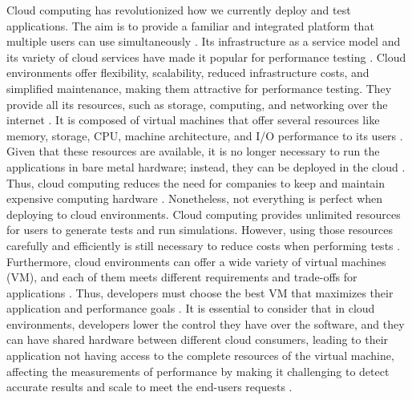 Cloud computing has revolutionized how we currently deploy and test applications. The aim is to provide a familiar and integrated platform that multiple users can use simultaneously \cite{hwang2015cloudperformance}. Its infrastructure as a service model and its variety of cloud services have made it popular for performance testing \cite{scheuner2018cloudBenchmarkingSuit, scheuner2018estimatingCloudApplication}. Cloud environments offer flexibility, scalability, reduced infrastructure costs, and simplified maintenance, making them attractive for performance testing. They provide all its resources, such as storage, computing, and networking over the internet \cite{vazquez2014cloudBenchmarkSurvey, borhani2014wpress, langer2011virtualmachineperformancebenchmarking}. It is composed of virtual machines that offer several resources like memory, storage, \ac{CPU}, machine architecture, and \ac{I/O} performance to its users \cite{gillam2013fair}. Given that these resources are available, it is no longer necessary to run the applications in bare metal hardware; instead, they can be deployed in the cloud \cite{he2019statistics, iosup2011performanceVariability}. Thus, cloud computing reduces the need for companies to keep and maintain expensive computing hardware \cite{iosup2011performanceVariability}. Nonetheless, not everything is perfect when deploying to cloud environments. Cloud computing provides unlimited resources for users to generate tests and run simulations. However, using those resources carefully and efficiently is still necessary to reduce costs when performing tests \cite{snellman2011towardsAutomatic}. \\
Furthermore, cloud environments can offer a wide variety of virtual machines (\ac{VM}), and each of them meets different requirements and trade-offs for applications \cite{scheuner2018estimatingCloudApplication, varghese2016cloudbenchmarkingformaximising}. Thus, developers must choose the best \ac{VM} that maximizes their application and performance goals \cite{yadwadkar2017selectingthebest, varghese2016cloudbenchmarkingformaximising}. It is essential to consider that in cloud environments, developers lower the control they have over the software, and they can have shared hardware between different cloud consumers, leading to their application not having access to the complete resources of the virtual machine, affecting the measurements of performance by making it challenging to detect accurate results \cite{he2019statistics, laaber2019softwaremicrobenchmarkinginthecloud, xiong2013Anautomatedmodeldrivenframework} and scale to meet the end-users requests \cite{vazquez2014cloudBenchmarkSurvey, folkerts2012benchmarking}. \\
